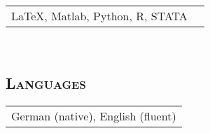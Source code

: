 \documentclass[12pt]{article}
\begin{document}
\begin{tabular}{p{}p{}}
	\LaTeX, Matlab, Python, \textsf{R}, STATA
\end{tabular}\\
\vspace{-0.45cm}\subsection*{\textsc{Languages}}
\begin{tabular}{l}
German (native), English (fluent)
\end{tabular}\\
\end{document}
